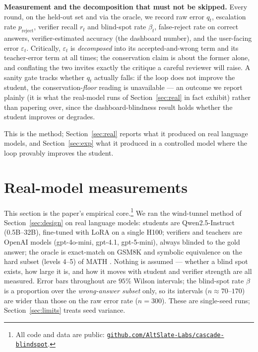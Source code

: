 \documentclass[11pt]{article}
\begin{document}
\textbf{Measurement and the decomposition that must not be skipped.}
Every round, on the held-out set and via the oracle, we record raw error
\(q_{t}\), escalation rate \(p_{\text{reject}}\), verifier recall
\(r_{t}\) and blind-spot rate \(\beta_{t}\), false-reject rate on
correct answers, verifier-estimated accuracy (the dashboard number), and
the user-facing error \(\varepsilon_{t}\). Critically,
\(\varepsilon_{t}\) is \emph{decomposed} into its accepted-and-wrong
term and its teacher-error term at all times; the conservation claim is
about the former alone, and conflating the two invites exactly the
critique a careful reviewer will raise. A sanity gate tracks whether
\(q_{t}\) actually falls: if the loop does not improve the student, the
conservation-\emph{floor} reading is unavailable --- an outcome we
report plainly (it is what the real-model runs of Section~\ref{sec:real}
in fact exhibit) rather than papering over, since the
dashboard-blindness result holds whether the student improves or
degrades.

This is the method; Section~\ref{sec:real} reports what it produced on
real language models, and Section~\ref{sec:exp} what it produced in a
controlled model where the loop provably improves the student.

\section{Real-model measurements}

\protect{}\label{sec:real}{}

This section is the paper's empirical core.\footnote{All code and data
  are public:
  \href{https://github.com/AltSlate-Labs/cascade-blindspot}{\texttt{github.com/AltSlate-Labs/cascade-blindspot}}.}
We ran the wind-tunnel method of Section~\ref{sec:design} on real
language models: students are Qwen2.5-Instruct (0.5B--32B), fine-tuned
with LoRA on a single H100; verifiers and teachers are OpenAI models
(gpt-4o-mini, gpt-4.1, gpt-5-mini), always blinded to the gold answer;
the oracle is exact-match on GSM8K \cite{cobbe2021gsm8k} and symbolic
equivalence on the hard subset (levels 4--5) of MATH
\cite{hendrycks2021math}. Nothing is assumed --- whether a blind spot
exists, how large it is, and how it moves with student and verifier
strength are all measured. Error bars throughout are \(95\%\) Wilson
intervals; the blind-spot rate \(\beta\) is a proportion over the
\emph{wrong-answer subset} only, so its intervals
(\(n \approx 70\)--\(170\)) are wider than those on the raw error rate
(\(n = 300\)). These are single-seed runs; Section~\ref{sec:limits}
treats seed variance.
\end{document}
